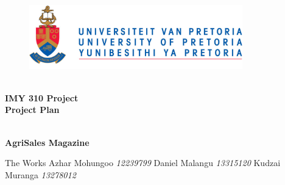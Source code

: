 \begin{titlepage}
	\begin{center}
		
		\begin{figure}[t]
			\centering
			\includegraphics[width=350px]{../Images/UP_Logo.png}
		\end{figure}
		
		\textsc{\large } \\ 
		\vspace{2cm}
		\textbf{\Huge IMY 310 Project  \\ [0.25cm]
			Project Plan} \\ 

		\textsc{\large } \\ 
		\vspace{0.75cm}

		\textbf{\Large AgriSales Magazine} \\ 
		
		\begin{flushright} \large
			The Works \emph{} \newline
			\newline 
			Azhar Mohungoo \emph{12239799} \newline
			Daniel Malangu \emph{13315120} \newline
			Kudzai Muranga 	\emph{13278012} \newline
			\end{flushright}
		
	\end{center}
\end{titlepage}
